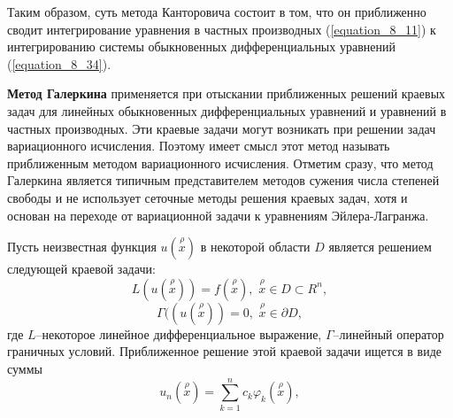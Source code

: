 	Таким образом, суть метода Канторовича состоит в том, что он приближенно сводит интегрирование уравнения в частных производных (\ref{equation_8_11}) к интегрированию системы обыкновенных дифференциальных уравнений (\ref{equation_8_34}).


	{\bf Метод Галеркина} применяется при отыскании приближенных решений краевых задач для линейных обыкновенных дифференциальных уравнений и уравнений в частных производных. Эти краевые задачи могут возникать при решении задач вариационного исчисления. Поэтому имеет смысл этот метод называть приближенным методом вариационного исчисления. Отметим сразу, что метод Галеркина является типичным представителем методов сужения числа степеней свободы и не использует сеточные методы решения краевых задач, хотя и основан на переходе от вариационной задачи к уравнениям Эйлера-Лагранжа.

	Пусть неизвестная функция $u(\overset{\rho}{x})$ в некоторой области $D$ является решением следующей краевой задачи:
	$$L(u(\overset{\rho}{x}))=f(\overset{\rho}{x}),\,\,\overset{\rho}{x}\in D\subset R^n,$$
	$$\Gamma((u(\overset{\rho}{x}))=0,\,\,\overset{\rho}{x}\in \partial D,$$
	где $L$–некоторое линейное дифференциальное выражение, $\Gamma$–линейный оператор граничных условий. Приближенное решение этой краевой задачи ищется в виде суммы
	$$\textstyle u_n(\overset{\rho}{x})=\sum\limits^n_{k=1} c_k\varphi_k(\overset{\rho}{x}),$$

